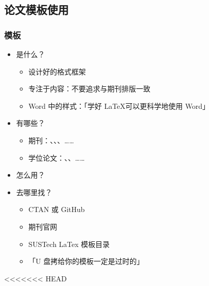   \subsection{论文模板使用}
  \begin{frame}[fragile]
    \frametitle{模板}
    \begin{itemize}
      \item<+-> 是什么？
    
        \begin{itemize}
          \item 设计好的格式框架
          \item 专注于内容：\alert{不要追求与期刊排版一致}
          \item Word 中的样式：「学好 \LaTeX  可以更科学地使用 Word」
        \end{itemize}
    
      \item<+-> 有哪些？
    
        \begin{itemize}
          \item 期刊：、、、……
          \item 学位论文：、、\alert{}……
        \end{itemize}
    
      \item<+-> 怎么用？
    
    
      \item<+-> 去哪里找？
    
        \begin{itemize}
          \item CTAN  或 GitHub \href{https://github.com}{\faGithub}
          \item 期刊官网
          \item SUSTech LaTex 模板目录 
          \item 「U 盘拷给你的模板一定是过时的」
        \end{itemize}
    \end{itemize}
    \end{frame}
<<<<<<< HEAD
  
